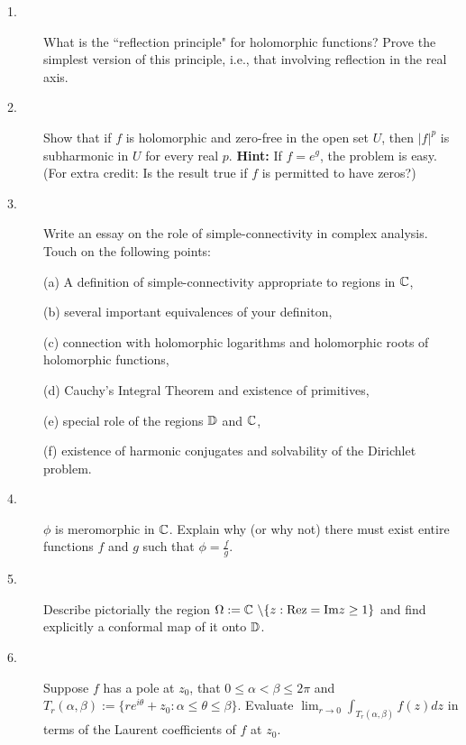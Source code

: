 \documentclass{article}
\begin{document}
\begin{description}
\item[1.]
What is the ``reflection principle" for holomorphic functions? Prove the
simplest version of this principle, i.e., that involving reflection in the
real axis.

\item[2.]
Show that if $f$ is holomorphic and zero-free in the open set $U$, then
$|f|^p$ is subharmonic in $U$ for every real $p$. {\bf Hint:} If
$f = e^g$, the problem is easy. (For extra credit: Is the result true if
$f$ is permitted to have zeros?)

\item[3.]
Write an essay on the role of simple-connectivity in complex analysis. Touch
on the following points:

\item[\quad] (a)
A definition of simple-connectivity appropriate to regions in $\Bbb C$,

\item[\quad] (b)
several important equivalences of your definiton,

\item[\quad] (c)
connection with holomorphic logarithms and holomorphic roots of
holomorphic functions,

\item[\quad] (d)
Cauchy's Integral Theorem and existence of primitives,

\item[\quad] (e)
special role of the regions $\Bbb D$ and $\Bbb C$,

\item[\quad] (f)
existence of harmonic conjugates and solvability of the Dirichlet problem.

\item[4.]
$\phi$ is meromorphic in $\Bbb C$. Explain why (or why not) there must
exist entire functions $f$ and $g$ such that $\phi = \frac{f}{g}$.

\item[5.]
Describe pictorially the region
$\Omega := \Bbb C\ \backslash \{z : \hbox{Rez} = \hbox{Im}z \geq 1 \}$ and find explicitly a
conformal map of it onto $\Bbb D$.

\item[6.]
Suppose $f$ has a pole at $z_0$, that $0 \leq \alpha < \beta \leq 2\pi$
and $T_r (\alpha, \beta) := \{re^{i\theta} + z_0 : \alpha \leq \theta \leq
 \beta \}$.
Evaluate $\lim_{r \to 0} \int_{T_r(\alpha, \beta)} f(z)dz$ in terms of the
Laurent coefficients of $f$ at $z_0$.


\end{description}
\end{document}
